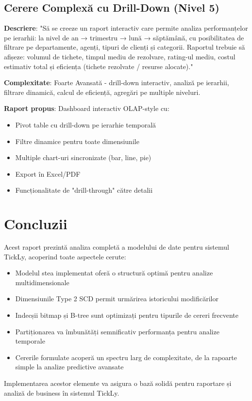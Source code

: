 \section{Cerere Complexă cu Drill-Down (Nivel 5)}

\textbf{Descriere}: "Să se creeze un raport interactiv care permite analiza performanțelor pe ierarhii: la nivel de an → trimestru → lună → săptămână, cu posibilitatea de filtrare pe departamente, agenți, tipuri de clienți și categorii. Raportul trebuie să afișeze: volumul de tichete, timpul mediu de rezolvare, rating-ul mediu, costul estimativ total și eficiența (tichete rezolvate / resurse alocate)."

\textbf{Complexitate}: Foarte Avansată - drill-down interactiv, analiză pe ierarhii, filtrare dinamică, calcul de eficiență, agregări pe multiple niveluri.

\textbf{Raport propus}: Dashboard interactiv OLAP-style cu:
\begin{itemize}
    \item Pivot table cu drill-down pe ierarhie temporală
    \item Filtre dinamice pentru toate dimensiunile
    \item Multiple chart-uri sincronizate (bar, line, pie)
    \item Export în Excel/PDF
    \item Funcționalitate de "drill-through" către detalii
\end{itemize}

\chapter{Concluzii}
\label{sec:concluzii}

Acest raport prezintă analiza completă a modelului de date pentru sistemul TickLy, acoperind toate aspectele cerute:

\begin{itemize}
    \item Modelul stea implementat oferă o structură optimă pentru analize multidimensionale
    \item Dimensiunile Type 2 SCD permit urmărirea istoricului modificărilor
    \item Indecșii bitmap și B-tree sunt optimizați pentru tipurile de cereri frecvente
    \item Partiționarea va îmbunătăți semnificativ performanța pentru analize temporale
    \item Cererile formulate acoperă un spectru larg de complexitate, de la rapoarte simple la analize predictive avansate
\end{itemize}

Implementarea acestor elemente va asigura o bază solidă pentru raportare și analiză de business în sistemul TickLy.

